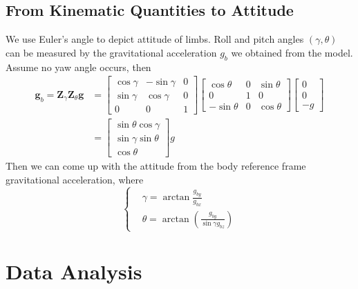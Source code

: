 \documentclass[12pt]{article}
\begin{document}
    \subsection{From Kinematic Quantities to Attitude}
    We use Euler's angle to depict attitude of limbs.  Roll and pitch angles $(\gamma, \theta)$ can be measured by the gravitational acceleration $g_b$ we obtained from the model. Assume no yaw angle occurs, then
    \begin{equation}
    \begin{aligned}
        \bm{g}_b = \bm{Z}_{\gamma} \bm{Z}_{\theta} \bm{g}
        &= \begin{bmatrix}
            \cos \gamma & -\sin \gamma & 0 \\
            \sin \gamma & \cos \gamma & 0\\
            0 & 0 & 1
        \end{bmatrix} \begin{bmatrix}
            \cos \theta & 0 & \sin \theta \\
            0 & 1 & 0\\
            -\sin \theta & 0 & \cos \theta
        \end{bmatrix} 
        \begin{bmatrix}
            0 \\ 0 \\ -g
        \end{bmatrix} \\
        &= \begin{bmatrix}
            \sin \theta \cos \gamma \\ \sin \gamma \sin \theta \\ \cos \theta
        \end{bmatrix} g
    \end{aligned}
    \end{equation}
    Then we can come up with the attitude from the body reference frame gravitational acceleration, where
    \begin{equation}
        \left\{ \begin{aligned} &\gamma = \arctan \frac{g_{by}}{g_{bx}}  \\
            & \theta = \arctan \left( \frac{g_{by}}{\sin \gamma g_{bz}}\right) \end{aligned} \right.
    \end{equation}
\newpage 
    \section{Data Analysis}
\end{document}
